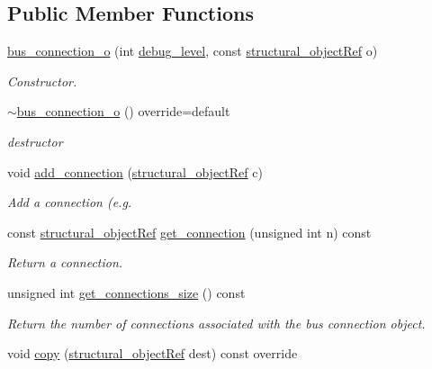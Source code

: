 \subsection*{Public Member Functions}
\begin{DoxyCompactItemize}
\item 
\hyperlink{classbus__connection__o_a485c5badad3181d1cd72456260af1a61}{bus\+\_\+connection\+\_\+o} (int \hyperlink{classstructural__object_ac2744292aa7f0fca3742133d16bb3201}{debug\+\_\+level}, const \hyperlink{structural__objects_8hpp_a8ea5f8cc50ab8f4c31e2751074ff60b2}{structural\+\_\+object\+Ref} o)
\begin{DoxyCompactList}\small\item\em Constructor. \end{DoxyCompactList}\item 
\hyperlink{classbus__connection__o_ab5e4bb277a16d2d50835d5f0065efa7a}{$\sim$bus\+\_\+connection\+\_\+o} () override=default
\begin{DoxyCompactList}\small\item\em destructor \end{DoxyCompactList}\item 
void \hyperlink{classbus__connection__o_aad176147ffe4df3512c00d3f58fa0b73}{add\+\_\+connection} (\hyperlink{structural__objects_8hpp_a8ea5f8cc50ab8f4c31e2751074ff60b2}{structural\+\_\+object\+Ref} c)
\begin{DoxyCompactList}\small\item\em Add a connection (e.\+g. \end{DoxyCompactList}\item 
const \hyperlink{structural__objects_8hpp_a8ea5f8cc50ab8f4c31e2751074ff60b2}{structural\+\_\+object\+Ref} \hyperlink{classbus__connection__o_acf9a1afb75c103ef417fdba4a87b2c0f}{get\+\_\+connection} (unsigned int n) const
\begin{DoxyCompactList}\small\item\em Return a connection. \end{DoxyCompactList}\item 
unsigned int \hyperlink{classbus__connection__o_a33bc2eb332f138bce27623ab76ce1305}{get\+\_\+connections\+\_\+size} () const
\begin{DoxyCompactList}\small\item\em Return the number of connections associated with the bus connection object. \end{DoxyCompactList}\item 
void \hyperlink{classbus__connection__o_a67b9b2ec30278115a9c545fa082c633b}{copy} (\hyperlink{structural__objects_8hpp_a8ea5f8cc50ab8f4c31e2751074ff60b2}{structural\+\_\+object\+Ref} dest) const override

\end{DoxyCompactItemize}
